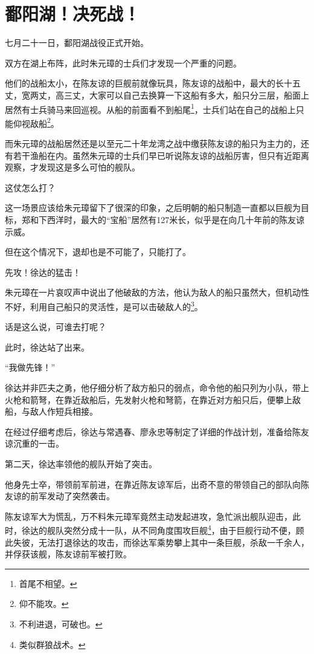 \section{鄱阳湖！决死战！}
\ifnum{}
	\begin{multicols}{\theparacolNo}
		\fi
		七月二十一日，鄱阳湖战役正式开始。

		双方在湖上布阵，此时朱元璋的士兵们才发现一个严重的问题。

		他们的战船太小，在陈友谅的巨舰前就像玩具，陈友谅的战船中，最大的长十五丈，宽两丈，高三丈，大家可以自己去换算一下这船有多大，船只分三层，船面上居然有士兵骑马来回巡视。从船的前面看不到船尾\footnote{首尾不相望。}，士兵们站在自己的战船上只能仰视敌船\footnote{仰不能攻。}。

		而朱元璋的战船居然还是以至元二十年龙湾之战中缴获陈友谅的船只为主力的，还有若干渔船在内。虽然朱元璋的士兵们早已听说陈友谅的战船厉害，但只有近距离观察，才发现这是多么可怕的舰队。

		这仗怎么打？

		这一场景应该给朱元璋留下了很深的印象，之后明朝的船只制造一直都以巨舰为目标，郑和下西洋时，最大的“宝船”居然有127米长，似乎是在向几十年前的陈友谅示威。

		但在这个情况下，退却也是不可能了，只能打了。

		先攻！徐达的猛击！

		朱元璋在一片哀叹声中说出了他破敌的方法，他认为敌人的船只虽然大，但机动性不好，利用自己船只的灵活性，是可以击破敌人的\footnote{不利进退，可破也。}。

		话是这么说，可谁去打呢？

		此时，徐达站了出来。

		“我做先锋！”

		徐达并非匹夫之勇，他仔细分析了敌方船只的弱点，命令他的船只列为小队，带上火枪和箭弩，在靠近敌船后，先发射火枪和弩箭，在靠近对方船只后，便攀上敌船，与敌人作短兵相接。

		在经过仔细考虑后，徐达与常遇春、廖永忠等制定了详细的作战计划，准备给陈友谅沉重的一击。

		第二天，徐达率领他的舰队开始了突击。

		他身先士卒，带领前军前进，在靠近陈友谅军后，出奇不意的带领自己的部队向陈友谅的前军发动了突然袭击。

		陈友谅军大为慌乱，万不料朱元璋军竟然主动发起进攻，急忙派出舰队迎击，此时，徐达的舰队突然分成十一队，从不同角度围攻巨舰\footnote{类似群狼战术。}，由于巨舰行动不便，顾此失彼，无法打退徐达的攻击，而徐达军乘势攀上其中一条巨舰，杀敌一千余人，并俘获该舰，陈友谅前军被打败。


\end{multicols}

